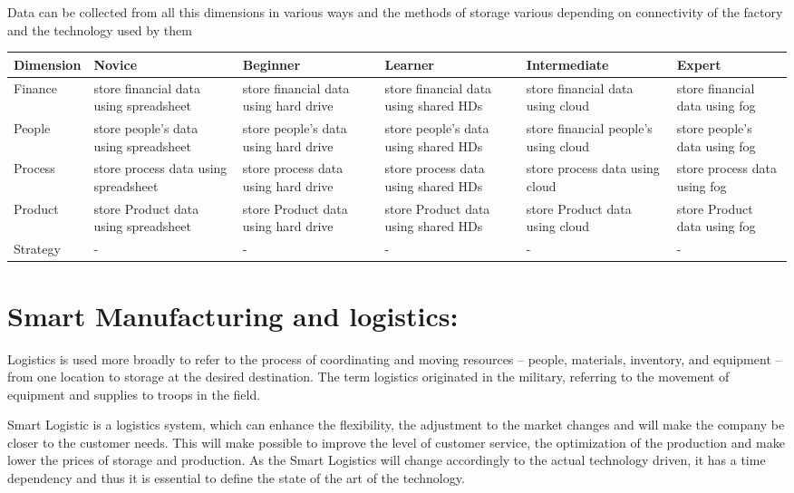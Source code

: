 \documentclass{article}
\begin{document}
\begin{normalsize}
\begin{itemize}
{}
\end{itemize}
	Data can be collected from all this dimensions in various ways and the methods of storage various depending on connectivity of the factory and the technology used by them
	\begin{center}
	
	
	\begin{tabu} to 0.8\textwidth { | X[c,] | X[c] | X[c] |  X[c]| X[c]| X[c]|}
	 \hline
	 Dimension & Novice & Beginner & Learner & Intermediate & Expert \\	
	 \hline
	 Finance & store financial data using spreadsheet & store financial data using hard drive & store financial data using shared HDs & store financial data using cloud & store financial data using fog \\
	\hline
	 People & store people’s data using spreadsheet & store people’s data using hard drive & store people’s data using shared HDs & store financial people’s using cloud & store people’s data using fog \\
	 \hline
	 Process & store process data using spreadsheet & store process data using hard drive & store process data using shared HDs & store process data using cloud & store process data using fog \\
	 \hline
	 Product & store Product data using spreadsheet & store Product data using hard drive & store Product data using shared HDs & store Product data using cloud & store Product data using fog \\
	 \hline
	 Strategy & - & - & - & - &-\\
	 \hline
	\end{tabu}
	\end{center}
\section{Smart Manufacturing and logistics:}
	Logistics is used more broadly to refer to the process of coordinating and moving resources – people, materials, inventory, and equipment – from one location to storage at the desired destination. The term logistics originated in the military, referring to the movement of equipment and supplies to troops in the field.
	
	 Smart Logistic is a logistics system, which can enhance the flexibility, the adjustment to the market changes and
will make the company be closer to the customer needs. This will make possible to improve the level of customer
service, the optimization of the production and make lower the prices of storage and production. As the Smart
Logistics will change accordingly to the actual technology driven, it has a time dependency and thus it is essential to
define the state of the art of the technology.


\end{normalsize}
\end{document}
